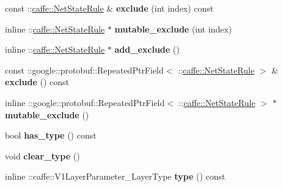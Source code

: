 \begin{DoxyCompactItemize}
\item 
\mbox{\label{classcaffe_1_1_v1_layer_parameter_a95cd617bb479bc651f51cd2c6bb85441}} 
const \+::\mbox{\hyperlink{classcaffe_1_1_net_state_rule}{caffe\+::\+Net\+State\+Rule}} \& {\bfseries exclude} (int index) const
\item 
\mbox{\label{classcaffe_1_1_v1_layer_parameter_a500151ec2c9d871ead3c66db3d43e4e1}} 
inline \+::\mbox{\hyperlink{classcaffe_1_1_net_state_rule}{caffe\+::\+Net\+State\+Rule}} $\ast$ {\bfseries mutable\+\_\+exclude} (int index)
\item 
\mbox{\label{classcaffe_1_1_v1_layer_parameter_a1f368b8782b08dee2ee3e7d1acf9c347}} 
inline \+::\mbox{\hyperlink{classcaffe_1_1_net_state_rule}{caffe\+::\+Net\+State\+Rule}} $\ast$ {\bfseries add\+\_\+exclude} ()
\item 
\mbox{\label{classcaffe_1_1_v1_layer_parameter_a42ea8d51670e0854ac5977fb43dc35e8}} 
const \+::google\+::protobuf\+::\+Repeated\+Ptr\+Field$<$ \+::\mbox{\hyperlink{classcaffe_1_1_net_state_rule}{caffe\+::\+Net\+State\+Rule}} $>$ \& {\bfseries exclude} () const
\item 
\mbox{\label{classcaffe_1_1_v1_layer_parameter_a78f736ee8e5ded620e2d7272a42956d7}} 
inline \+::google\+::protobuf\+::\+Repeated\+Ptr\+Field$<$ \+::\mbox{\hyperlink{classcaffe_1_1_net_state_rule}{caffe\+::\+Net\+State\+Rule}} $>$ $\ast$ {\bfseries mutable\+\_\+exclude} ()
\item 
\mbox{\label{classcaffe_1_1_v1_layer_parameter_abab5a930abe01bd1620b6d9563433f31}} 
bool {\bfseries has\+\_\+type} () const
\item 
\mbox{\label{classcaffe_1_1_v1_layer_parameter_a59877db4cfa69e445769672de44b9446}} 
void {\bfseries clear\+\_\+type} ()
\item 
\mbox{\label{classcaffe_1_1_v1_layer_parameter_afb73a184cd942b7195355588767f6f7c}} 
inline \+::caffe\+::\+V1\+Layer\+Parameter\+\_\+\+Layer\+Type {\bfseries type} () const

\end{DoxyCompactItemize}
